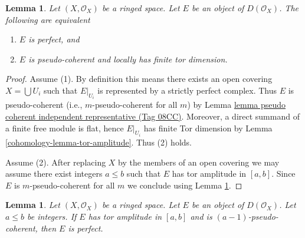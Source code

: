 \documentclass{amsart}
\theoremstyle{plain}
\newtheorem{lemma}[subsection]{Lemma}
\theoremstyle{definition}
\theoremstyle{remark}
\numberwithin{equation}{subsection}
\begin{document}
\begin{lemma}
\label{cohomology-lemma-perfect}
Let $(X, \mathcal{O}_X)$ be a ringed space.
Let $E$ be an object of $D(\mathcal{O}_X)$.
The following are equivalent
\begin{enumerate}
\item $E$ is perfect, and
\item $E$ is pseudo-coherent and locally has finite tor dimension.
\end{enumerate}
\end{lemma}

\begin{proof}
Assume (1). By definition this means there exists an open covering
$X = \bigcup U_i$ such that $E|_{U_i}$ is represented by a
strictly perfect complex. Thus $E$ is pseudo-coherent (i.e.,
$m$-pseudo-coherent for all $m$) by
Lemma \href{https://stacks.math.columbia.edu/tag/08CC}{lemma pseudo coherent independent representative (Tag 08CC)}.
Moreover, a direct summand of a finite free module is flat, hence
$E|_{U_i}$ has finite Tor dimension by
Lemma \ref{cohomology-lemma-tor-amplitude}. Thus (2) holds.

\medskip\noindent
Assume (2). After replacing $X$ by the members of an open covering
we may assume there exist integers $a \leq b$ such that $E$
has tor amplitude in $[a, b]$. Since $E$ is $m$-pseudo-coherent
for all $m$ we conclude using Lemma \ref{cohomology-lemma-perfect-precise}.
\end{proof}


\begin{lemma}
\label{cohomology-lemma-perfect-precise}
Let $(X, \mathcal{O}_X)$ be a ringed space.
Let $E$ be an object of $D(\mathcal{O}_X)$.
Let $a \leq b$ be integers. If $E$ has tor amplitude in $[a, b]$
and is $(a - 1)$-pseudo-coherent, then $E$ is perfect.
\end{lemma}
\end{document}
